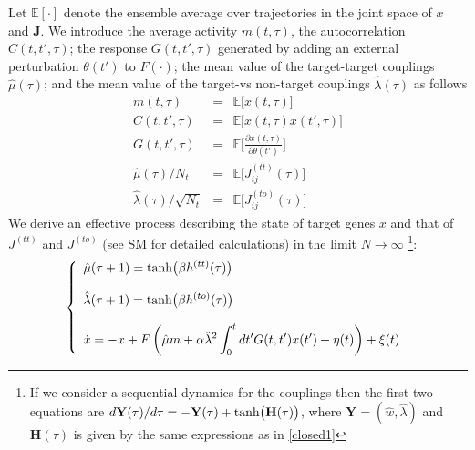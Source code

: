\documentclass[%
 reprint,
superscriptaddress,
 amsmath,amssymb,
 prl,
]{revtex4-2}
\begin{document}
 Let $\mathbb{E}[\cdot]$ denote the ensemble average over  trajectories in the joint space of $x$ and $\mathbf{J}$. We introduce the average activity $m(t, \tau)$, the autocorrelation $C(t,t',\tau)$; the response $G(t,t',\tau)$  generated by adding   an external perturbation $\theta(t')$ to $F(\cdot)$; the mean value of the target-target couplings $\hat{\mu}(\tau)$; and the mean value of the target-vs non-target couplings $\hat{\lambda}(\tau)$ as follows
 \begin{subequations}
\label{allequations1}
 \begin{eqnarray}
m(t,\tau) &=& \mathbb{E}\big[x(t,\tau)\big] 
  \label{orderparameter1}
\\ C(t,t',\tau) &=& \mathbb{E}\big[x(t,\tau) x(t',\tau)\big] \label{orderparameter2}\\
    G(t,t',\tau) &=& \mathbb{E}\Big[\frac{\partial x(t,\tau)}{\partial \theta(t')}\Big]\label{orderparameter3}
    \\
   \hat{\mu}(\tau)/N_t &=& \mathbb{E}\Big[J_{ij}^{(tt)} (\tau)\Big]
       \label{orderparameter4}
        \\
   \hat{\lambda}(\tau)/\sqrt{N_t} &=& \mathbb{E}\Big[J_{ij}^{(to)} (\tau)\Big]
\end{eqnarray}
\end{subequations}
We derive an effective process describing  the state of target genes $x$  and that of $J^{(tt)}$ and $J^{(to)}$ (see SM for detailed calculations) in the  limit $N\rightarrow \infty$ \footnote{If we consider a sequential dynamics for the couplings then the first two  equations are $
   d\mathbf{Y}(\tau)/d\tau  = - \mathbf{Y}(\tau) + {\rm tanh} \big(\mathbf{H}(\tau)\big)$, where $\mathbf{Y} = (\hat{w}, \hat{\lambda})$ and $\mathbf{H}(\tau)$ is given by the same expressions as in \eqref{closed1}}: %
 \begin{equation}
    \left \{ \begin{array}{l} \displaystyle  \hat{\mu}(\tau+1)  = {\rm tanh}\big( \beta h^{(tt)} (\tau)\big) \\ \\ \displaystyle  \hat{\lambda}(\tau+1)  = {\rm tanh}\big( \beta h^{(to)} (\tau)\big)\\ \\ \displaystyle   \dot{x} = -x + F\left(\hat{\mu}m  +   \alpha \hat{\lambda}^2 \int_0^t dt' G(t,t')x(t')+\eta(t) \right)+ \xi(t) 
     \end{array} \right.\, 
     \label{closed1}
\end{equation}
\end{document}
